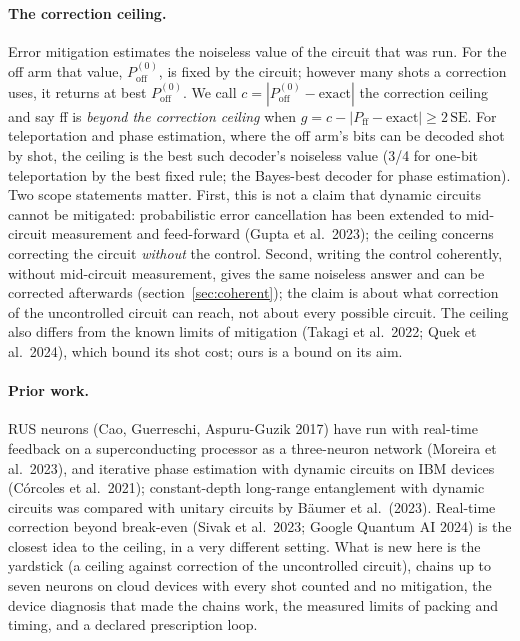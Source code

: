 \documentclass[10pt,a4paper]{article}
\begin{document}
\paragraph{The correction ceiling.} Error mitigation estimates the noiseless value of the circuit that was run. For the
off arm that value, $P_\mathrm{off}^{(0)}$, is fixed by the circuit; however many shots a correction uses, it returns at
best $P_\mathrm{off}^{(0)}$. We call $c = |P_\mathrm{off}^{(0)} - \text{exact}|$ the correction ceiling and say ff is
\emph{beyond the correction ceiling} when $g = c - |P_\mathrm{ff} - \text{exact}| \ge 2\,\mathrm{SE}$. For teleportation
and phase estimation, where the off arm's bits can be decoded shot by shot, the ceiling is the best such decoder's
noiseless value (3/4 for one-bit teleportation by the best fixed rule; the Bayes-best decoder for phase estimation). Two
scope statements matter. First, this is not a claim that dynamic circuits cannot be mitigated: probabilistic error
cancellation has been extended to mid-circuit measurement and feed-forward (Gupta et al.\ 2023); the ceiling concerns
correcting the circuit \emph{without} the control. Second, writing the control coherently, without mid-circuit
measurement, gives the same noiseless answer and can be corrected afterwards (section~\ref{sec:coherent}); the claim is
about what correction of the uncontrolled circuit can reach, not about every possible circuit. The ceiling also differs
from the known limits of mitigation (Takagi et al.\ 2022; Quek et al.\ 2024), which bound its shot cost; ours is a
bound on its aim.

\paragraph{Prior work.} RUS neurons (Cao, Guerreschi, Aspuru-Guzik 2017) have run with real-time feedback on a
superconducting processor as a three-neuron network (Moreira et al.\ 2023), and iterative phase estimation with dynamic
circuits on IBM devices (C\'orcoles et al.\ 2021); constant-depth long-range entanglement with dynamic circuits was
compared with unitary circuits by B\"aumer et al.\ (2023). Real-time correction beyond break-even (Sivak et al.\ 2023;
Google Quantum AI 2024) is the closest idea to the ceiling, in a very different setting. What is new here is the
yardstick (a ceiling against correction of the uncontrolled circuit), chains up to seven neurons on cloud devices with
every shot counted and no mitigation, the device diagnosis that made the chains work, the measured limits of packing and
timing, and a declared prescription loop.
\end{document}
